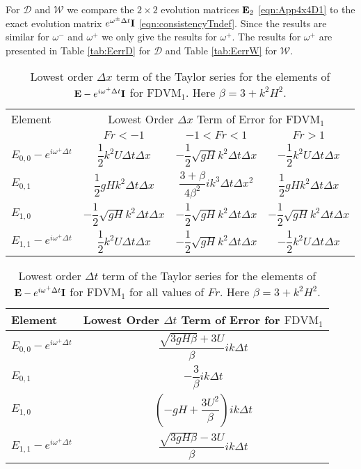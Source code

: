 For $\mathcal{D}$ and $\mathcal{W}$ we compare the $2\times 2$ evolution matrices $\mathbf{E}_2$ \eqref{eqn:App4x4D1} to the exact evolution matrix $e^{\omega^\pm \Delta t } \mathbf{I}$ \eqref{eqn:consistencyTndef}. Since the results are similar for $\omega^-$ and $\omega^+$ we only give the results for $\omega^+$. The results for $\omega^+$ are presented in Table \ref{tab:EerrD} for $\mathcal{D}$ and Table \ref{tab:EerrW} for $\mathcal{W}$.

\begin{table}
	\centering
	\begin{tabular}{l c c c}
		\hline
		Element & \multicolumn{3}{c}{Lowest Order $\Delta x$ Term of Error for $\text{FDVM}_1$} \T \B \\ 
		\cline{2-4}
		& $Fr < -1$  & $-1 < Fr < 1$ & $Fr > 1$ \T \B \\ 
		\hline
		$E_{0,0} -  e^{i \omega^+ \Delta t} $& $ \dfrac{1}{2} k^2 U \Delta t \Delta x$& $ - \dfrac{1}{2} \sqrt{gH} k^2 \Delta t\Delta x$ &  $- \dfrac{1}{2} k^2 U \Delta t \Delta x$  \T \B \\
		$E_{0,1}$& $\dfrac{1}{2}gHk^2 \Delta t \Delta x $  &$ \dfrac{3 + \beta}{4 \beta^2}i k^3\Delta  t\Delta x^2$ & $\dfrac{1}{2}gHk^2 \Delta t \Delta x $ \T \B   \\
		$E_{1,0}$& $ - \dfrac{1}{2} \sqrt{gH} k^2 \Delta t\Delta x$  &$ - \dfrac{1}{2} \sqrt{gH} k^2 \Delta t\Delta x$ & $ - \dfrac{1}{2} \sqrt{gH} k^2 \Delta t\Delta x$ \T \B  \\
		$E_{1,1} -  e^{i \omega^+ \Delta t}$& $ \dfrac{1}{2} k^2 U \Delta t \Delta x$  &$ - \dfrac{1}{2} \sqrt{gH} k^2 \Delta t\Delta x$ & $- \dfrac{1}{2} k^2 U \Delta t \Delta x$  \T\B  \\
		\hline
	\end{tabular}
	\caption{Lowest order $\Delta x$ term of the Taylor series for the elements of $\mathbf{E} - e^{i \omega^+ \Delta t} \mathbf{I}$ for $\text{FDVM}_1$. Here $\beta = 3 + k^2 H^2$.}
	\label{tab:EerrFDVM1dxerror} 
\end{table}
\begin{table}
	\centering
	\begin{tabular}{l c}
		\hline 
		Element & \multicolumn{1}{c}{Lowest Order $\Delta t$ Term of Error for $\text{FDVM}_1$}\T\B \\
		\hline 
		$E_{0,0} -  e^{i \omega^+ \Delta t} $ & $\dfrac{\sqrt{3gH \beta} + 3U}{\beta} ik \Delta t$ \T \B \\
		$E_{0,1}$&  $ - \dfrac{3}{\beta} ik\Delta t$ \T \B \\
		$E_{1,0}$&   $ \left(-gH + \dfrac{3U^2}{\beta}\right)ik \Delta t$ \T \B  \\
		$E_{1,1} -  e^{i \omega^+ \Delta t}$& $\dfrac{\sqrt{3gH \beta} - 3U}{\beta} ik \Delta t$ \T \B  \\
		\hline
	\end{tabular}
	\caption{Lowest order $\Delta t$ term of the Taylor series for the elements of $\mathbf{E} - e^{i \omega^+ \Delta t} \mathbf{I}$ for $\text{FDVM}_1$ for all values of $Fr$. Here $\beta = 3 + k^2 H^2$.}
	\label{tab:EerrFDVM1dterror} 
\end{table}
